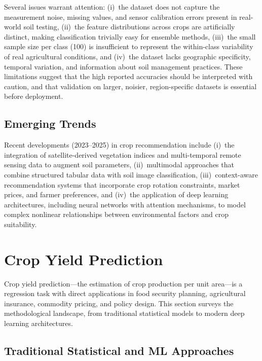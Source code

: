 \documentclass[journal]{IEEEtran}
\begin{document}
Several issues warrant attention: (i)~the dataset does not capture the measurement noise, missing values, and sensor calibration errors present in real-world soil testing, (ii)~the feature distributions across crops are artificially distinct, making classification trivially easy for ensemble methods, (iii)~the small sample size per class (100) is insufficient to represent the within-class variability of real agricultural conditions, and (iv)~the dataset lacks geographic specificity, temporal variation, and information about soil management practices. These limitations suggest that the high reported accuracies should be interpreted with caution, and that validation on larger, noisier, region-specific datasets is essential before deployment.

\subsection{Emerging Trends}

Recent developments (2023--2025) in crop recommendation include (i)~the integration of satellite-derived vegetation indices and multi-temporal remote sensing data to augment soil parameters, (ii)~multimodal approaches that combine structured tabular data with soil image classification, (iii)~context-aware recommendation systems that incorporate crop rotation constraints, market prices, and farmer preferences, and (iv)~the application of deep learning architectures, including neural networks with attention mechanisms, to model complex nonlinear relationships between environmental factors and crop suitability.


\section{Crop Yield Prediction}
\label{sec:yield}

Crop yield prediction---the estimation of crop production per unit area---is a regression task with direct applications in food security planning, agricultural insurance, commodity pricing, and policy design. This section surveys the methodological landscape, from traditional statistical models to modern deep learning architectures.

\subsection{Traditional Statistical and ML Approaches}
\end{document}
